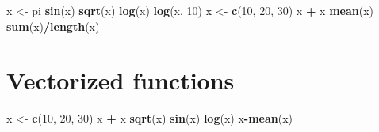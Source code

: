 \documentclass[]{book}
\newenvironment{Shaded}{\begin{snugshade}}{\end{snugshade}}
\newcommand{\KeywordTok}[1]{\textcolor[rgb]{0.13,0.29,0.53}{\textbf{#1}}}
\newcommand{\DecValTok}[1]{\textcolor[rgb]{0.00,0.00,0.81}{#1}}
\newcommand{\StringTok}[1]{\textcolor[rgb]{0.31,0.60,0.02}{#1}}
\newcommand{\OperatorTok}[1]{\textcolor[rgb]{0.81,0.36,0.00}{\textbf{#1}}}
\newcommand{\NormalTok}[1]{#1}
\begin{document}
\begin{Shaded}
\begin{Highlighting}[]
\NormalTok{x <-}\StringTok{ }\NormalTok{pi}
\KeywordTok{sin}\NormalTok{(x)}
\KeywordTok{sqrt}\NormalTok{(x)}
\KeywordTok{log}\NormalTok{(x)}
\KeywordTok{log}\NormalTok{(x, }\DecValTok{10}\NormalTok{)}
\NormalTok{x <-}\StringTok{ }\KeywordTok{c}\NormalTok{(}\DecValTok{10}\NormalTok{, }\DecValTok{20}\NormalTok{, }\DecValTok{30}\NormalTok{)}
\NormalTok{x }\OperatorTok{+}\StringTok{ }\NormalTok{x}
\KeywordTok{mean}\NormalTok{(x)}
\KeywordTok{sum}\NormalTok{(x)}\OperatorTok{/}\KeywordTok{length}\NormalTok{(x)}
\end{Highlighting}
\end{Shaded}

\hypertarget{vectorized-functions}{%
\section{Vectorized functions}\label{vectorized-functions}}

\begin{Shaded}
\begin{Highlighting}[]
\NormalTok{x <-}\StringTok{ }\KeywordTok{c}\NormalTok{(}\DecValTok{10}\NormalTok{, }\DecValTok{20}\NormalTok{, }\DecValTok{30}\NormalTok{)}
\NormalTok{x }\OperatorTok{+}\StringTok{ }\NormalTok{x}
\KeywordTok{sqrt}\NormalTok{(x)}
\KeywordTok{sin}\NormalTok{(x)}
\KeywordTok{log}\NormalTok{(x)}
\NormalTok{x}\OperatorTok{-}\KeywordTok{mean}\NormalTok{(x)}
\end{Highlighting}
\end{Shaded}


\end{document}
